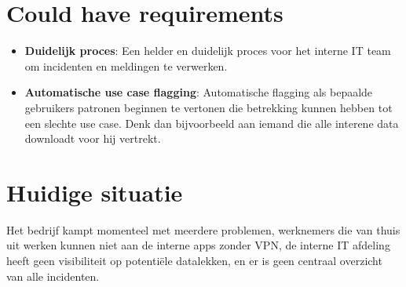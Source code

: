 \section{Could have requirements}
\begin{itemize}
  \item \textbf{Duidelijk proces}: Een helder en duidelijk proces voor het interne IT team om incidenten en meldingen te verwerken. 
  \item \textbf{Automatische use case flagging}: Automatische flagging als bepaalde gebruikers patronen beginnen te vertonen die betrekking kunnen hebben tot een slechte use case. Denk dan bijvoorbeeld aan iemand die alle interene data downloadt voor hij vertrekt.
\end{itemize}

\section{Huidige situatie}
Het bedrijf kampt momenteel met meerdere problemen, werknemers die van thuis uit werken kunnen niet aan de interne apps zonder VPN, de interne IT afdeling heeft geen visibiliteit op potentiële datalekken, en er is geen centraal overzicht van alle incidenten.

